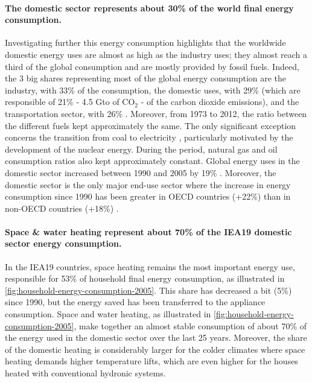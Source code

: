 \paragraph{The domestic sector represents about 30\% of the world
  final energy consumption.} Investigating further this energy
consumption highlights that the worldwide domestic energy uses are
almost as high as the industry uses; they almost reach a third of the
global consumption and are mostly provided by fossil
fuels. Indeed, the 3
big shares representing most of the global energy consumption are the
industry, with 33\% of the consumption, the domestic uses, with 29\%
(which are responsible of 21\% - 4.5 Gto of CO$_{2}$ - of the carbon dioxide emissions), and the
transportation sector, with 26\%
\citep[p.\,17]{iea-2008a}. Moreover, from
1973 to 2012, the ratio between the different fuels kept approximately
the same. The only significant exception concerns the transition from
coal to electricity \citep[p.\,28]{iea-2014a}, particularly motivated
by the development of the nuclear energy. During the period, natural
gas and oil consumption ratios also kept approximately
constant. Global
energy uses in the domestic sector increased between 1990 and 2005 by
19\% \citep[p.\,44]{iea-2008a}. Moreover, the domestic sector is the
only major end-use sector where the increase in energy consumption
since 1990 has been greater in OECD countries (+22\%) than in non-OECD
countries (+18\%) \citep[p.\,44]{iea-2008a}.


\paragraph{Space \& water heating represent about 70\% of the IEA19
  domestic sector energy consumption.} In the IEA19
countries, space heating remains the most important energy use,
responsible for 53\% of household final energy consumption, as
illustrated in \cref{fig:household-energy-consumption-2005}. This
share has decreased a bit (5\%) since 1990, but the energy saved has
been transferred to the appliance consumption. Space and water
heating, as illustrated in
\cref{fig:household-energy-consumption-2005}, make together an almost
stable consumption of about 70\% of the energy used in the domestic
sector over the last 25 years. Moreover, the share of the domestic
heating is considerably larger for the colder climates where space
heating demands higher temperature lifts, which are even higher for
the houses heated with conventional hydronic
systems.

